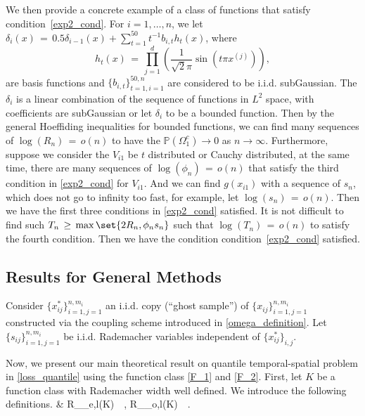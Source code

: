 \documentclass[twoside,11pt]{article}
\begin{document}
\begin{example}
We then provide a concrete example of a class of functions that satisfy condition~\eqref{exp2_cond}. 
For $i = 1, \dots, n$, we let \(\delta_i(x) \,=\, 0.5\delta_{i-1}(x) +  \sum_{t=1}^{50} t^{-1}b_{i,t}h_t(x)\), where
\[
h_t(x) \,=\, \prod_{j=1}^d\left(\frac{1}{\sqrt{2}\pi} \sin(t\pi x^{(j)})\right),
\]
are basis functions and \(\{b_{i,t}\}_{t=1,i=1}^{50,n}\) are considered to be i.i.d. subGaussian.
The $\delta_i$ is a linear combination of the sequence of functions in $L^2$ space, with coefficients are subGaussian or let $\delta_i$ to be a bounded function. Then by the general Hoeffiding inequalities for bounded functions, we can find many sequences of $\log(R_n) \,=\, o(n)$ to have the $\mathbb{P}(\Omega_1^c) \to 0$ as $n \rightarrow \infty$.  
Furthermore, suppose we consider the $V_{i1}$ be $t$ distributed or Cauchy distributed, at the same time, there are many sequences of $\log(\phi_n) \,=\, o(n) $ that satisfy the third condition in \eqref{exp2_cond} for $V_{i1}$. And we can find 
$g(x_{i1})$ with a sequence of $s_n$, which does not go to infinity too fast, for example, let $\log(s_n) \,=\, o(n)$. Then we have the first three conditions in \eqref{exp2_cond} satisfied. It is not difficult to find such $T_n \,\geq\, \max\set{2R_n, \phi_n s_n}$ such that $\log(T_n) \,=\, o(n)$ to satisfy the fourth condition. Then we have the condition condition~\eqref{exp2_cond} satisfied. 

\end{example}

\subsection{Results for General Methods}
Consider $\{x_{ij}^*\}_{i=1,j=1}^{n,m_i}$ an i.i.d. copy (``ghost sample'') of 
$\{x_{ij}\}_{i=1,j=1}^{n,m_i}$ constructed via the coupling scheme introduced in \eqref{omega_definition}.
Let $\{s_{ij}\}_{i=1,j=1}^{n,m_i}$ be i.i.d. Rademacher variables independent of 
$\{x_{ij}^*\}_{i,j}$.


Now, we present our main theoretical result on quantile temporal-spatial problem in \eqref{loss_quantile} 
using the function class \eqref{F_1} and \eqref{F_2}. First, let $K$ be a function class with Rademacher width well defined. We introduce the following definitions. 
\beq 
\label{rademacher_def_blocks}
& R_{_{e,l}}(K) \,\coloneqq\,  , \quad
R_{_{o,l}}(K) \,\coloneqq\, . 
\beq 
\end{document}
